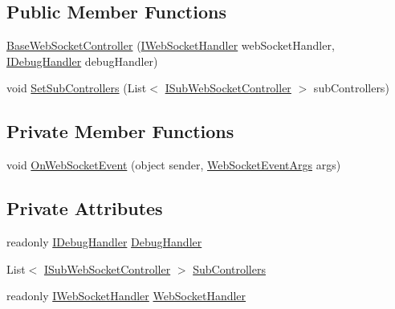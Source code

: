 \subsection*{Public Member Functions}
\begin{DoxyCompactItemize}
\item 
\mbox{\hyperlink{class_little_weeb_library_1_1_controllers_1_1_base_web_socket_controller_a0e9c1d617d9de0f8b1aec72078a81b18}{Base\+Web\+Socket\+Controller}} (\mbox{\hyperlink{interface_little_weeb_library_1_1_handlers_1_1_i_web_socket_handler}{I\+Web\+Socket\+Handler}} web\+Socket\+Handler, \mbox{\hyperlink{interface_little_weeb_library_1_1_handlers_1_1_i_debug_handler}{I\+Debug\+Handler}} debug\+Handler)
\item 
void \mbox{\hyperlink{class_little_weeb_library_1_1_controllers_1_1_base_web_socket_controller_ae799e6c0e4c3ed0200b18a0360968ac8}{Set\+Sub\+Controllers}} (List$<$ \mbox{\hyperlink{interface_little_weeb_library_1_1_controllers_1_1_i_sub_web_socket_controller}{I\+Sub\+Web\+Socket\+Controller}} $>$ sub\+Controllers)
\end{DoxyCompactItemize}
\subsection*{Private Member Functions}
\begin{DoxyCompactItemize}
\item 
void \mbox{\hyperlink{class_little_weeb_library_1_1_controllers_1_1_base_web_socket_controller_a5344934da2b25a2ec1599b2ec86dd06e}{On\+Web\+Socket\+Event}} (object sender, \mbox{\hyperlink{class_little_weeb_library_1_1_event_arguments_1_1_web_socket_event_args}{Web\+Socket\+Event\+Args}} args)
\end{DoxyCompactItemize}
\subsection*{Private Attributes}
\begin{DoxyCompactItemize}
\item 
readonly \mbox{\hyperlink{interface_little_weeb_library_1_1_handlers_1_1_i_debug_handler}{I\+Debug\+Handler}} \mbox{\hyperlink{class_little_weeb_library_1_1_controllers_1_1_base_web_socket_controller_a24d4bcbb4e3711480785bb3ba0490a87}{Debug\+Handler}}
\item 
List$<$ \mbox{\hyperlink{interface_little_weeb_library_1_1_controllers_1_1_i_sub_web_socket_controller}{I\+Sub\+Web\+Socket\+Controller}} $>$ \mbox{\hyperlink{class_little_weeb_library_1_1_controllers_1_1_base_web_socket_controller_a73de333945e3c5cbba6976077e62d61c}{Sub\+Controllers}}
\item 
readonly \mbox{\hyperlink{interface_little_weeb_library_1_1_handlers_1_1_i_web_socket_handler}{I\+Web\+Socket\+Handler}} \mbox{\hyperlink{class_little_weeb_library_1_1_controllers_1_1_base_web_socket_controller_a4f9d71be8e7e947390a2c15dae5692ab}{Web\+Socket\+Handler}}
\end{DoxyCompactItemize}


